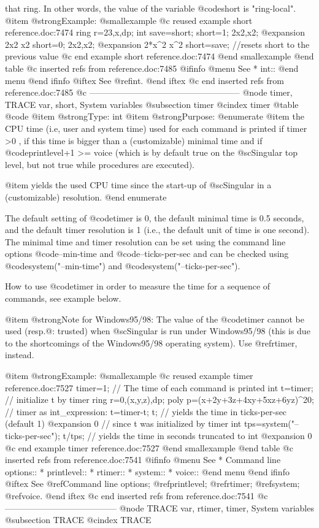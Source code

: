 {{{{{{{{that ring. In other words, the value of the variable @code{short} is
"ring-local".
@item @strong{Example:}
@smallexample
@c reused example short reference.doc:7474 
  ring r=23,x,dp;
  int save=short;
  short=1;
  2x2,x2;
@expansion{} 2x2 x2
  short=0;
  2x2,x2;
@expansion{} 2*x^2 x^2
  short=save;  //resets short to the previous value
@c end example short reference.doc:7474
@end smallexample
@end table
@c inserted refs from reference.doc:7485
@ifinfo
@menu
See
* int::
@end menu
@end ifinfo
@iftex
See
@ref{int}.
@end iftex
@c end inserted refs from reference.doc:7485
@c -----------------------------------------------------
@node timer, TRACE var, short, System variables
@subsection timer
@cindex timer
@table @code
@item @strong{Type:}
int
@item @strong{Purpose:}
@enumerate
@item
the CPU time (i.e, user and system time) used for each command is
printed if timer >0 , if this
time is bigger than a (customizable) minimal time and
if @code{printlevel+1 >= voice} (which is by default true on the
@sc{Singular} top level, but not true while procedures are executed).

@item
yields the used CPU time since the start-up of @sc{Singular} in a
(customizable) resolution.
@end enumerate

The default setting of @code{timer} is 0, the default minimal time is
0.5 seconds, and the default timer resolution is 1 (i.e., the default unit
of time is one second). The minimal time and timer resolution
can be set using the command line options @code{--min-time} and
@code{--ticks-per-sec} and can be checked using
@code{system("--min-time")} and @code{system("--ticks-per-sec")}.

How to use @code{timer} in order to measure the time for a sequence of
commands, see example below.

@item @strong{Note for Windows95/98:}
The value of the @code{timer} cannot be used (resp.@: trusted) when
@sc{Singular} is run under Windows95/98 (this is due to the shortcomings
of the Windows95/98 operating system). Use @ref{rtimer}, instead.

@item @strong{Example:}
@smallexample
@c reused example timer reference.doc:7527 
  timer=1; // The time of each command is printed
  int t=timer; // initialize t by timer
  ring r=0,(x,y,z),dp;
  poly p=(x+2y+3z+4xy+5xz+6yz)^20;
  // timer as int_expression:
  t=timer-t;
  t;  // yields the time in ticks-per-sec (default 1)
@expansion{} 0
      // since t was initialized by timer
  int tps=system("--ticks-per-sec");
  t/tps; // yields the time in seconds truncated to int
@expansion{} 0
@c end example timer reference.doc:7527
@end smallexample
@end table
@c inserted refs from reference.doc:7541
@ifinfo
@menu
See
* Command line options::
* printlevel::
* rtimer::
* system::
* voice::
@end menu
@end ifinfo
@iftex
See
@ref{Command line options};
@ref{printlevel};
@ref{rtimer};
@ref{system};
@ref{voice}.
@end iftex
@c end inserted refs from reference.doc:7541
@c ---------------------------------------
@node TRACE var, rtimer, timer, System variables
@subsection TRACE
@cindex TRACE

}}}}}}}}
